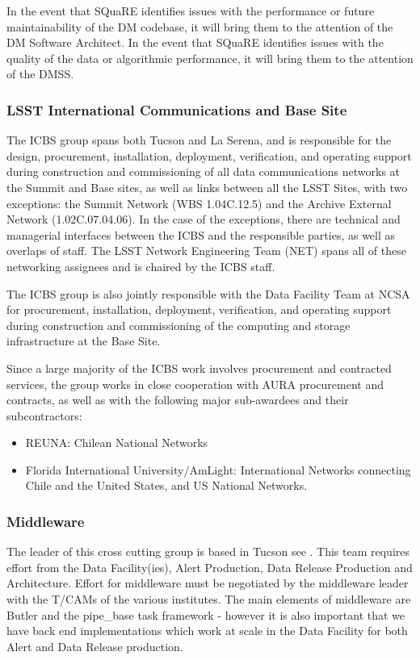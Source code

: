 In the event that \gls{SQuaRE} identifies issues with the performance or future maintainability of the \gls{DM} codebase, it will bring them to the attention of the \gls{DM} Software Architect. In the event that \gls{SQuaRE} identifies issues with the quality of the data or algorithmic performance, it will bring them to the attention of the \gls{DMSS}.

\subsubsection{LSST International Communications and Base Site}
The \gls{ICBS} group spans both Tucson and La Serena, and is responsible for the design, procurement, installation, deployment, verification, and operating support during construction and commissioning of all data communications networks at the \gls{Summit} and Base sites, as well as links between all the \gls{LSST} Sites, with two exceptions:  the \gls{Summit} Network (\gls{WBS} 1.04C.12.5) and the \gls{Archive} External Network (1.02C.07.04.06).  In the case of the exceptions, there are technical and managerial interfaces between the \gls{ICBS} and the responsible parties, as well as overlaps of staff.  The \gls{LSST} Network Engineering Team (\gls{NET}) spans all of these networking assignees and is chaired by the \gls{ICBS} staff.

The \gls{ICBS} group is also jointly responsible with the Data Facility Team at \gls{NCSA} for procurement, installation, deployment, verification, and operating support during construction and commissioning of the computing and storage infrastructure at the Base Site.

Since a large majority of the \gls{ICBS} work involves procurement and contracted services, the group works in close cooperation with \gls{AURA} procurement and contracts, as well as with the following major sub-awardees and their subcontractors:

\begin{itemize}
	\item \gls{REUNA}: Chilean National Networks
	\item Florida International University/AmLight: International Networks connecting Chile and the United States, and \gls{US} National Networks.
\end{itemize}

\subsubsection{Middleware \label{sec:middleware}}
The leader of this cross cutting group is based in Tucson see .
This team  requires effort from the Data Facility(ies), Alert Production,  Data Release Production and Architecture.
Effort for middleware must be negotiated by the middleware leader with the \gls{T/CAM}s of the various institutes.
The main elements of middleware are \gls{Butler} and the pipe\_base task framework - however it is also important that we have back end implementations which work at scale in the Data Facility for both Alert and Data Release production.


